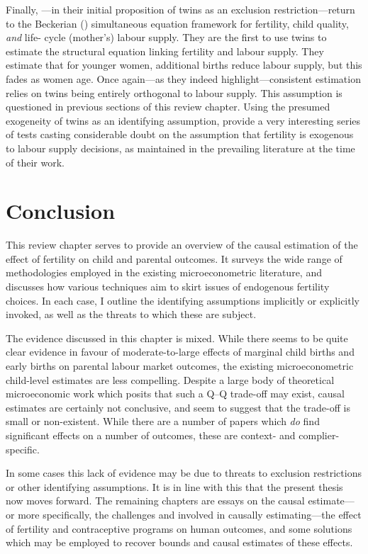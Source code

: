 Finally, \citet{RosenzweigWolpin1980b}---in their initial proposition of twins as
an exclusion restriction---return to the Beckerian (\citeyear{BeckerLewis1973})
simultaneous equation framework for fertility, child quality, \emph{and} life-%
cycle (mother's) labour supply.  They are the first to use twins to estimate
the structural equation linking fertility and labour supply.  They estimate
that for younger women, additional births reduce labour supply, but this fades
as women age.  Once again---as they indeed highlight---consistent estimation
relies on twins being entirely orthogonal to labour supply.  This assumption 
is questioned in previous sections of this review chapter. Using the presumed 
exogeneity of twins as an identifying assumption, \citet{RosenzweigWolpin1980b} 
provide a very interesting series of tests casting considerable doubt on the 
assumption that fertility is exogenous to labour supply decisions, as maintained 
in the prevailing literature at the time of their work.


\section{Conclusion}
This review chapter serves to provide an overview of the causal estimation of 
the effect of fertility on child and parental outcomes.  It surveys the wide 
range of methodologies employed in the existing microeconometric literature, and 
discusses how various techniques aim to skirt issues of endogenous fertility 
choices.  In each case, I outline the identifying assumptions implicitly or
explicitly invoked, as well as the threats to which these are subject.

The evidence discussed in this chapter is mixed.  While there seems to be 
quite clear evidence in favour of moderate-to-large effects of marginal child 
births and early births on parental labour market outcomes, the existing 
microeconometric child-level estimates are less compelling.  Despite a large
body of theoretical microeconomic work which posits that such a Q--Q trade-off 
may exist, causal estimates are certainly not conclusive, and seem to suggest 
that the trade-off is small or non-existent.  While there are a number of 
papers which \emph{do} find significant effects on a number of outcomes, these 
are context- and complier-specific.

In some cases this lack of evidence may be due to threats to exclusion 
restrictions or other identifying assumptions. It is in line with this that 
the present thesis now moves forward.  The remaining chapters are essays on the 
causal estimate---or more specifically, the challenges and involved in causally 
estimating---the effect of fertility and contraceptive programs on human 
outcomes, and some solutions which may be employed to recover bounds and causal
estimates of these effects.

